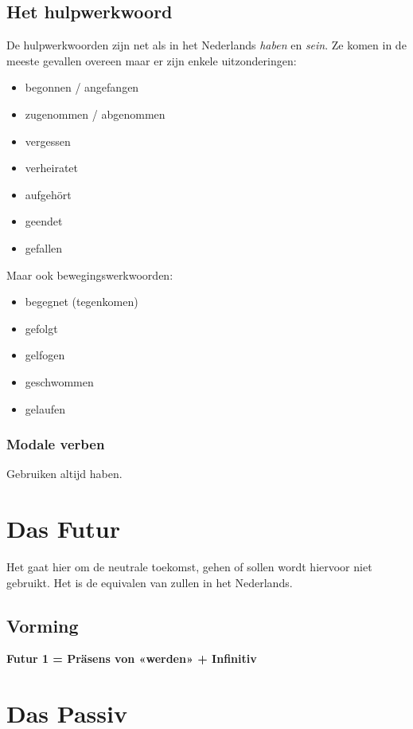 \documentclass[main.tex]{subfiles}
\begin{document}
\subsection{Het hulpwerkwoord}
De hulpwerkwoorden zijn net als in het Nederlands \textit{haben} en \textit{sein}.
Ze komen in de meeste gevallen overeen maar er zijn enkele uitzonderingen:
\begin{itemize}
\item begonnen / angefangen
\item zugenommen / abgenommen
\item vergessen
\item verheiratet
\item aufgehört
\item geendet
\item gefallen
\end{itemize}
Maar ook bewegingswerkwoorden:
\begin{itemize}
\item begegnet (tegenkomen)
\item gefolgt
\item gelfogen
\item geschwommen
\item gelaufen
\end{itemize}
\subsubsection{Modale verben}
Gebruiken altijd haben.
\section{Das Futur}
Het gaat hier om de neutrale toekomst, gehen of sollen wordt hiervoor niet gebruikt. Het is de equivalen van zullen in het Nederlands.
\subsection{Vorming}
\textbf{Futur 1 = Präsens von «werden» + Infinitiv}
\section{Das Passiv}
\end{document}
